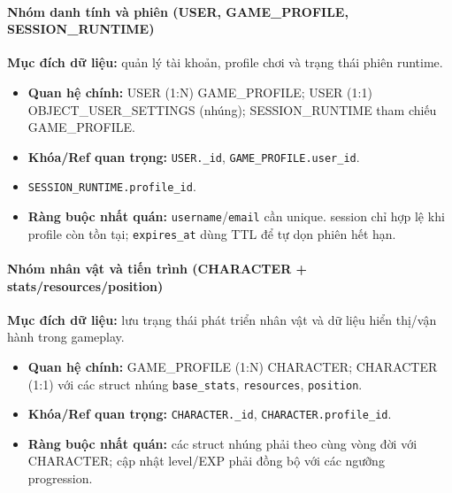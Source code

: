 \paragraph{Nhóm danh tính và phiên (USER, GAME\_PROFILE, SESSION\_RUNTIME)}
\textbf{Mục đích dữ liệu:} quản lý tài khoản, profile chơi và trạng thái phiên runtime.
\begin{itemize}
    \item \textbf{Quan hệ chính:} USER (1:N) GAME\_PROFILE; USER (1:1) OBJECT\_\allowbreak USER\_\allowbreak SETTINGS (nhúng); SESSION\_RUNTIME tham chiếu GAME\_PROFILE.
    \item \textbf{Khóa/\allowbreak Ref quan trọng:} \texttt{USER.\_id}, \texttt{GAME\_PROFILE.\allowbreak user\_id}.
    \item \texttt{SESSION\_RUNTIME.\allowbreak profile\_id}.
    \item \textbf{Ràng buộc nhất quán:} \texttt{username}/\texttt{email} cần unique.
    session chỉ hợp lệ khi profile còn tồn tại; \texttt{expires\_at} dùng TTL để tự dọn phiên hết hạn.
\end{itemize}

\paragraph{Nhóm nhân vật và tiến trình (CHARACTER + stats/resources/position)}
\textbf{Mục đích dữ liệu:} lưu trạng thái phát triển nhân vật và dữ liệu hiển thị/\allowbreak vận hành trong gameplay.
\begin{itemize}
    \item \textbf{Quan hệ chính:} GAME\_PROFILE (1:N) CHARACTER; CHARACTER (1:1) với các struct nhúng \texttt{base\_stats}, \texttt{resources}, \texttt{position}.
    \item \textbf{Khóa/\allowbreak Ref quan trọng:} \texttt{CHARACTER.\_id}, \texttt{CHARACTER.profile\_id}.
    \item \textbf{Ràng buộc nhất quán:} các struct nhúng phải theo cùng vòng đời với CHARACTER; cập nhật level/\allowbreak EXP phải đồng bộ với các ngưỡng progression.
\end{itemize}

